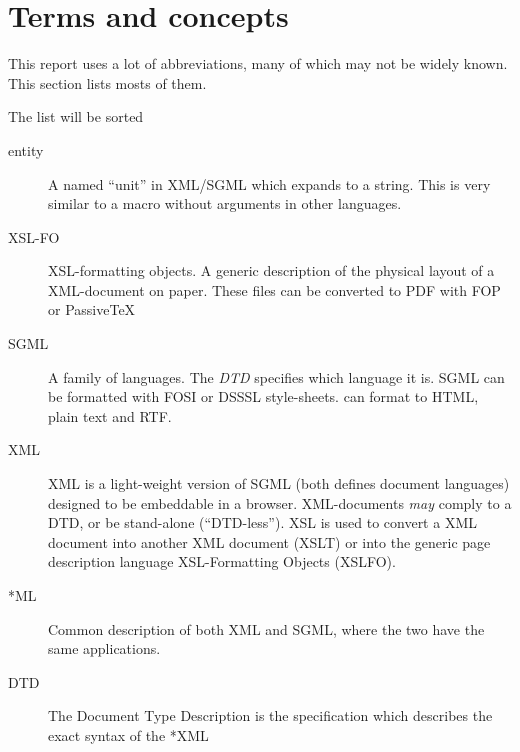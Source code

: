 
\chapter{Terms and concepts}
\label{cha:terms-and-concepts}



This report uses a lot of abbreviations, many of which may not be
widely known.  This section lists mosts of them.


\textsf{The list will be sorted}
\begin{description}

\item[entity] A named ``unit'' in XML/SGML which expands to a string.
  This is very similar to a macro without arguments in other
  languages.
  
\item[XSL-FO] XSL-formatting objects.  A generic description of the physical
  layout of a XML-document on paper.  These files can be converted to
  PDF with FOP or PassiveTeX
  
\item[SGML] A family of languages.  The \textit{DTD} specifies which
  language it is.  SGML can be formatted with FOSI or DSSSL
  style-sheets.   can format to HTML, plain text and
  RTF. 
  
\item[XML]
  
XML is a light-weight version of SGML (both defines document
languages) designed to be embeddable in a browser.  XML-documents
\textit{may} comply to a DTD, or be stand-alone (``DTD-less'').  XSL
is used to convert a XML document into another XML document (XSLT) or
into the generic page description language XSL-Formatting Objects
(XSLFO).


\item[*ML] Common description of both XML and SGML, where the two have
  the same applications.

\item[DTD] The Document Type Description is the specification
  which describes the exact syntax of the *XML



\end{description}
